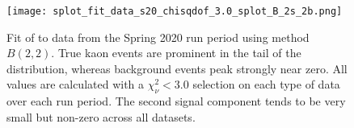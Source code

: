 \begin{figure}
  \begin{center}
    \texttt{[image: splot\_fit\_data\_s20\_chisqdof\_3.0\_splot\_B\_2s\_2b.png]}
  \end{center}
  \caption{Fit of  to data from the Spring 2020 run period using method $B(2,2)$. True kaon events are prominent in the tail of the distribution, whereas background events peak strongly near zero. All values are calculated with a $\chi^2_\nu < 3.0$ selection on each type of data over each run period. The second signal component tends to be very small but non-zero across all datasets.}\label{fig:splot-data-fit}
\end{figure}

